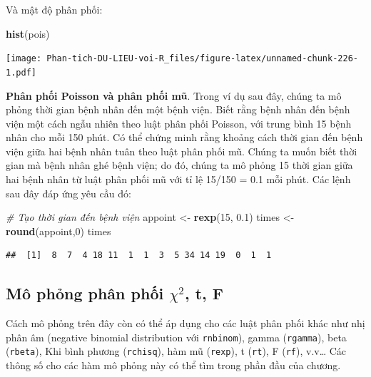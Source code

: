 \documentclass[
]{book}
\newenvironment{Shaded}{\begin{snugshade}}{\end{snugshade}}
\newcommand{\CommentTok}[1]{\textcolor[rgb]{0.56,0.35,0.01}{\textit{#1}}}
\newcommand{\DecValTok}[1]{\textcolor[rgb]{0.00,0.00,0.81}{#1}}
\newcommand{\FloatTok}[1]{\textcolor[rgb]{0.00,0.00,0.81}{#1}}
\newcommand{\KeywordTok}[1]{\textcolor[rgb]{0.13,0.29,0.53}{\textbf{#1}}}
\newcommand{\NormalTok}[1]{#1}
\newcommand{\StringTok}[1]{\textcolor[rgb]{0.31,0.60,0.02}{#1}}
\begin{document}
Và mật độ phân phối:

\begin{Shaded}
\begin{Highlighting}[]
\KeywordTok{hist}\NormalTok{(pois)}
\end{Highlighting}
\end{Shaded}

\texttt{[image: Phan-tich-DU-LIEU-voi-R\_files/figure-latex/unnamed-chunk-226-1.pdf]}

\textbf{Phân phối Poisson và phân phối mũ}. Trong ví dụ sau đây, chúng ta mô phỏng thời gian bệnh nhân đến một bệnh viện. Biết rằng bệnh nhân đến bệnh viện một cách ngẫu nhiên theo luật phân phối Poisson, với trung bình 15 bệnh nhân cho mỗi 150 phút. Có thể chứng minh rằng khoảng cách thời gian đến bệnh viện giữa hai bệnh nhân tuân theo luật phân phối mũ. Chúng ta muốn biết thời gian mà bệnh nhân ghé bệnh viện; do đó, chúng ta mô phỏng 15 thời gian giữa hai bệnh nhân từ luật phân phối mũ với tỉ lệ 15/150 = 0.1 mỗi phút. Các lệnh sau đây đáp ứng yêu cầu đó:

\begin{Shaded}
\begin{Highlighting}[]
\CommentTok{\# Tạo thời gian đến bệnh viện}
\NormalTok{appoint \textless{}{-}}\StringTok{ }\KeywordTok{rexp}\NormalTok{(}\DecValTok{15}\NormalTok{, }\FloatTok{0.1}\NormalTok{)}
\NormalTok{times \textless{}{-}}\StringTok{ }\KeywordTok{round}\NormalTok{(appoint,}\DecValTok{0}\NormalTok{)}
\NormalTok{times}
\end{Highlighting}
\end{Shaded}

\begin{verbatim}
##  [1]  8  7  4 18 11  1  1  3  5 34 14 19  0  1  1
\end{verbatim}

\hypertarget{muxf4-phux1ecfng-phuxe2n-phux1ed1i-chi2-t-f}{%
\subsection{\texorpdfstring{Mô phỏng phân phối \(\chi^{2}\), t, F}{Mô phỏng phân phối \textbackslash chi\^{}\{2\}, t, F}}\label{muxf4-phux1ecfng-phuxe2n-phux1ed1i-chi2-t-f}}

Cách mô phỏng trên đây còn có thể áp dụng cho các luật phân phối khác như nhị phân âm (negative binomial distribution với \texttt{rnbinom}), gamma (\texttt{rgamma}), beta (\texttt{rbeta}), Khi bình phương (\texttt{rchisq}), hàm mũ (\texttt{rexp}), t (\texttt{rt}), F (\texttt{rf}), v.v\ldots{} Các thông số cho các hàm mô phỏng này có thể tìm trong phần đầu của chương.
\end{document}
